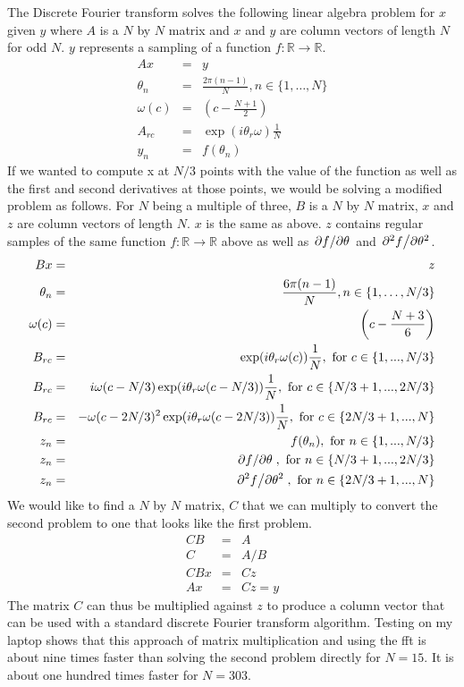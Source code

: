 \documentclass[11pt]{article} %
\begin{document}
The Discrete Fourier transform solves the following linear algebra problem for $ x $ given $ y $ where $ A $ is a $ N $ by $ N $ matrix and $ x $ and $ y $ are column vectors of length $ N $ for odd $ N $. $ y $ represents a sampling of a function $ f: \mathbb{R} \rightarrow \mathbb{R} $.
\begin{eqnarray}
Ax & = & y \\
\theta_n & = & \frac{2\pi (n -1)}{N}, n \in \{1, \hdots, N\} \\
\omega(c) & = & \left(c-\frac{N+1}{2} \right) \\
A_{rc} & = &  \exp(i\theta_r \omega) \frac{1}{N} \\
y_n & = & f(\theta_n)
\end{eqnarray}
If we wanted to compute x at $ N / 3 $  points with the value of the function as well as the first and second derivatives at those points, we would be solving a modified problem as follows. For $ N $ being a multiple of three, $ B $ is a $ N $ by $ N $ matrix, $ x $  and $ z $ are column vectors of length $ N $. $ x $  is the same as above. $ z $ contains regular samples of the same function  $ f: \mathbb{R} \rightarrow \mathbb{R} $ above as well as $ \pdv*{f}{\theta} $ and $ \pdv*[2]{f}{\theta} $.
\begin{eqnarray}
Bx & = & z \\
\theta_n & = & \frac{6\pi (n -1)}{N}, n \in \{1, \hdots, N/3\} \\
\omega(c) & = & \left(c-\frac{N+3}{6} \right) \\
B_{rc} & = & \exp(i\theta_r \omega(c) ) \frac{1}{N}, \mbox{ for } c \in \{1,...,N/3\} \\
B_{rc} & = & i\omega(c-N/3)\exp(i\theta_r \omega(c-N/3) ) \frac{1}{N}, \mbox{ for }  c \in \{N/3+1,...,2N/3\} \\
B_{rc} & = & -\omega(c-2N/3)^2\exp(i\theta_r \omega(c-2N/3) ) \frac{1}{N}, \mbox{ for }  c \in \{2N/3+1,...,N\} \\
z_n & = & f(\theta_n), \mbox{ for }  n \in \{1,...,N/3\} \\
z_n & = & \pdv*{f}{\theta} (\theta_{n-N/3}), \mbox{ for }  n \in \{N/3+1,...,2N/3\} \\
z_n & = & \pdv*[2]{f}{\theta} (\theta_{n-2N/3}), \mbox{ for }   n \in \{2N/3+1,...,N\} 
\end{eqnarray}
We would like to find a $N$ by $N$ matrix, $ C $ that we can multiply to convert the second problem to one that looks like the first problem.
\begin{eqnarray}
C B & = & A \\
C & = & A/B \\
C B x & = & C z \\
A x & = & C z = y
\end{eqnarray}
The matrix $ C $ can thus be multiplied against $ z $ to produce a column vector that can be used with a standard discrete Fourier transform algorithm. Testing on my laptop shows that this approach of matrix multiplication and using the fft is about nine times faster than solving the second problem directly for $ N = 15 $. It is about one hundred times faster for $ N = 303 $.
\end{document}
